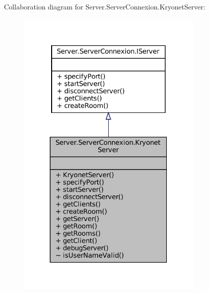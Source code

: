 Collaboration diagram for Server.\+Server\+Connexion.\+Kryonet\+Server\+:
\nopagebreak
\begin{figure}[H]
\begin{center}
\leavevmode
\includegraphics[width=256pt]{classServer_1_1ServerConnexion_1_1KryonetServer__coll__graph}
\end{center}
\end{figure}
